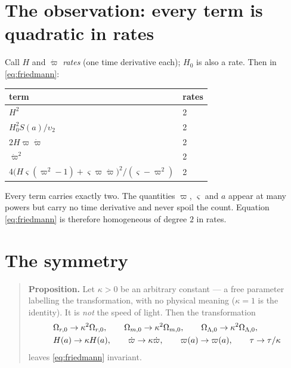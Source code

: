 \documentclass[11pt]{article}
\newcommand{\Om}{\Omega_{m,0}}
\newcommand{\Or}{\Omega_{r,0}}
\newcommand{\OL}{\Omega_{\Lambda,0}}
\newcommand{\ups}{\upsilon_2}
\begin{document}
\section{The observation: every term is quadratic in rates}

Call $H$ and $\dot\varpi$ \emph{rates} (one time derivative each); $H_0$ is
also a rate. Then in \eqref{eq:friedmann}:

\begin{center}
\begin{tabular}{ll}
\toprule
term & rates \\
\midrule
$H^2$ & 2 \\
$H_0^2 S(a)/\ups$ & 2 \\
$2H\varpi\dot\varpi$ & 2 \\
$\dot\varpi^2$ & 2 \\
$4\big(H\varsigma(\varpi^2-1)+\varsigma\varpi\dot\varpi\big)^2/(\varsigma-\varpi^2)$ & 2 \\
\bottomrule
\end{tabular}
\end{center}

Every term carries exactly two. The quantities $\varpi$, $\varsigma$ and $a$
appear at many powers but carry no time derivative and never spoil the count.
Equation \eqref{eq:friedmann} is therefore homogeneous of degree $2$ in rates.

\section{The symmetry}

\begin{quote}
\textbf{Proposition.} Let $\kappa>0$ be an arbitrary constant --- a free
parameter labelling the transformation, with no physical meaning ($\kappa=1$ is
the identity). It is \emph{not} the speed of light. Then the transformation
\begin{align}
&\Or\to \kappa^2\Or,\qquad \Om\to \kappa^2\Om,\qquad \OL\to \kappa^2\OL, \notag\\
&H(a)\to \kappa H(a),\qquad \dot\varpi\to \kappa\dot\varpi,\qquad
\varpi(a)\to\varpi(a),\qquad \tau\to\tau/\kappa
\label{eq:symmetry}
\end{align}
leaves \eqref{eq:friedmann} invariant.
\end{quote}
\end{document}
